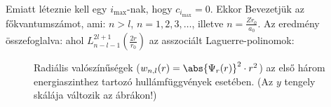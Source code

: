    Emiatt léteznie kell egy $i_\text{max}$-nak, hogy $c_{i_\text{max}}=0$.
   Ekkor 
    Bevezetjük az
    főkvantumszámot, ami: $n>l$, $n=1,2,3,\dots$, illetve $n=\frac{Z r_0}{a_0}$.
   Az eredmény összefoglalva:
    ahol $L_{n-l-1}^{2l+1}\left(\frac{2r}{r_0}\right)$ az asszociált Laguerre-polinomok:
    \begin{figure}[ht!]
     \centering
     \hspace{6pt}
     \hspace{6pt}
     \caption{Radiális valószínűségek ($w_{n,l}(r)=\abs{\Psi_r(r)}^2\cdot r^2$) az első három energiaszinthez tartozó hullámfüggvények esetében. (Az $y$ tengely skálája változik az ábrákon!)}
    \end{figure}
